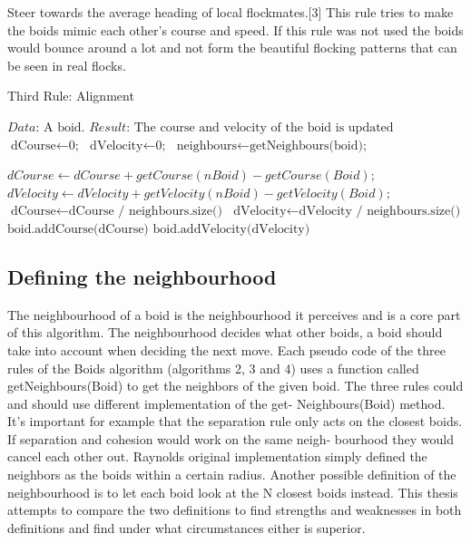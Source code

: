 \documentclass{article}
\begin{document}
Steer towards the average heading of local flockmates.[3] This rule tries to make the boids mimic each other's course and speed. If this rule was not used the boids would bounce around a lot and not form the beautiful flocking patterns that can be seen in real flocks.

\begin{algorithm}
\caption{Third Rule: Alignment}\label{euclid}
\begin{algorithmic}[1]
\State $\textit{Data:   } \text{A boid.}$
\State $\textit{Result:   } \text{The course and velocity of the boid is updated}$
\\
\State $\text{dCourse} \gets \text{0;}$
\State $\text{dVelocity} \gets \text{0;}$
\State $\text{neighbours} \gets \text{getNeighbours(boid);}$

    \State $ dCourse \gets dCourse + getCourse(nBoid) - getCourse(Boid);$
    \State $ dVelocity \gets dVelocity + getVelocity(nBoid) - getVelocity(Boid);$
\Endfor
\State $\text{dCourse} \gets \text{dCourse / neighbours.size()}$
\State $\text{dVelocity} \gets \text{dVelocity / neighbours.size()}$
\State $\text{boid.addCourse(dCourse)}$
\State $\text{boid.addVelocity(dVelocity)}$
\end{algorithmic}

\end{algorithm}

\pagebreak
\subsection{Defining the neighbourhood}
The neighbourhood of a boid is the neighbourhood it perceives and is a core part of this algorithm. The neighbourhood decides what other boids, a boid should take into account when deciding the next move.
Each pseudo code of the three rules of the Boids algorithm (algorithms 2, 3
and 4) uses a function called getNeighbours(Boid) to get the neighbors of the given
boid. The three rules could and should use different implementation of the get-
Neighbours(Boid) method. It’s important for example that the separation rule only
acts on the closest boids. If separation and cohesion would work on the same neigh-
bourhood they would cancel each other out.
Raynolds original implementation simply defined the neighbors as the boids
within a certain radius. Another possible definition of the neighbourhood is to let
each boid look at the N closest boids instead. This thesis attempts to compare the
two definitions to find strengths and weaknesses in both definitions and find under
what circumstances either is superior.
\end{document}
